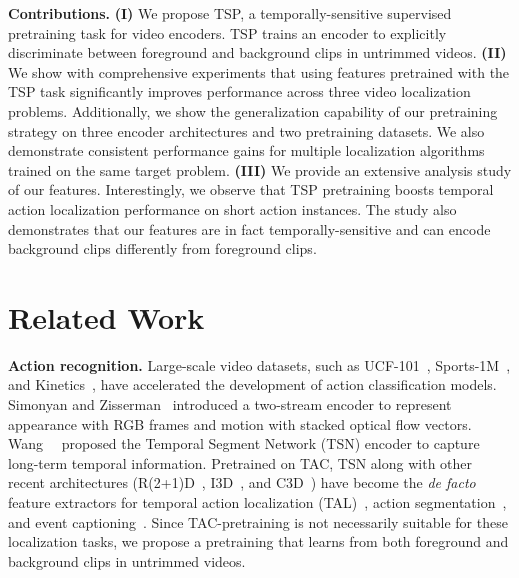 \documentclass[10pt,twocolumn,letterpaper]{article}
\begin{document}
\vspace{3pt}\noindent\textbf{Contributions.}
\textbf{(I)} We propose TSP, a temporally-sensitive supervised pretraining task for video encoders. TSP trains an encoder to explicitly discriminate between foreground and background clips in untrimmed videos.
\textbf{(II)} We show with comprehensive experiments that using features pretrained with the TSP task significantly improves performance across three video localization problems. Additionally, we show the generalization capability of our pretraining strategy on three encoder architectures and two pretraining datasets. We also demonstrate consistent performance gains for multiple localization algorithms trained on the same target problem. 
\textbf{(III)} We provide an extensive analysis study of our features. Interestingly, we observe that TSP pretraining boosts temporal action localization performance on short action instances. The study also demonstrates that our features are in fact temporally-sensitive and can encode background clips differently from foreground clips. 





 \section{Related Work}\label{sec:related_work}

\noindent\textbf{Action recognition.}
Large-scale video datasets, such as UCF-101~\cite{dataset_ucf101}, Sports-1M~\cite{dataset_sports1m}, and Kinetics~\cite{dataset_kinetics}, have accelerated the development of action classification models. Simonyan and Zisserman~\cite{two_stream} introduced a two-stream encoder to represent appearance with RGB frames and motion with stacked optical flow vectors. Wang~\etal~\cite{tsn} proposed the Temporal Segment Network (TSN) encoder to capture long-term temporal information. Pretrained on TAC, TSN along with other recent architectures (\eg R(2+1)D~\cite{tran2018closer}, I3D~\cite{i3d}, and C3D~\cite{c3d}) have become the \emph{de facto} feature extractors for temporal action localization (TAL)~\cite{piergiovanni_cvpr_2018}, action segmentation~\cite{action_segmentation}, and event captioning~\cite{event_captioning}. Since TAC-pretraining is not necessarily suitable for these localization tasks, we propose a pretraining that learns from both foreground and background clips in untrimmed videos.
\end{document}
